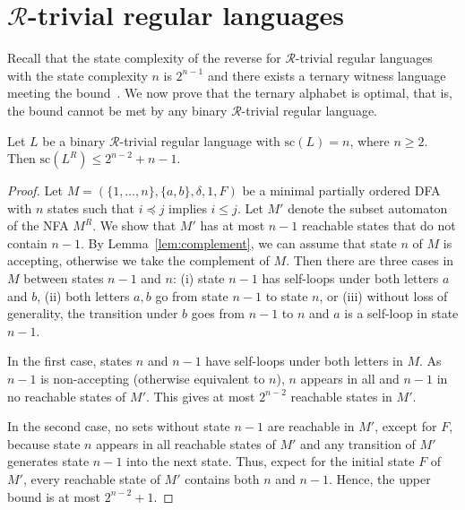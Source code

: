 \documentclass[runningheads]{llncs}
\newcommand{\R}{$\mathcal{R}$}
\renewcommand{\sc}{\mathrm{sc}}
\begin{document}
\section{\R-trivial regular languages}
  Recall that the state complexity of the reverse for \R-trivial regular languages with the state complexity $n$ is $2^{n-1}$ and there exists a ternary witness language meeting the bound~\cite{ciaa2012}. 
  We now prove that the ternary alphabet is optimal,
  that is, the bound
  cannot be met by any binary \R-trivial regular language. 

  \begin{lemma}\label{lem:binaryRtriv_upper}
    Let $L$ be a binary \R-trivial regular language with $\sc(L)=n$, where $n\ge2$.
    Then $\sc(L^R)\le 2^{n-2}+n-1$. 
  \end{lemma}
  \begin{proof}
    Let $M=(\{1,\ldots,n\},\{a,b\},\delta,1,F)$ be a minimal partially ordered DFA
    with $n$ states such that $i\preceq j$ implies $i\le j$. 
    Let $M'$ denote the subset automaton of the NFA $M^R$.
    We show that $M'$ has at most $n-1$ reachable states that do not contain $n-1$. 
    By Lemma~\ref{lem:complement}, we can assume that state $n$ of $M$ is accepting,    
    otherwise we take the complement of $M$. 
    Then there are three cases in $M$ between states $n-1$ and $n$:
    (i)   state $n-1$ has self-loops under both letters $a$ and $b$,
    (ii)  both letters $a,b$ go from state $n-1$ to state $n$, or
    (iii) without loss of generality, the transition under $b$ goes from $n-1$ to $n$ and $a$ is a self-loop in state $n-1$.

    In the first case, 
states $n$ and $n-1$ have self-loops under both letters in $M$.
    As $n-1$ is non-accepting (otherwise equivalent to $n$), $n$ appears in all and $n-1$ in no reachable states of $M'$.
    This gives at most $2^{n-2}$ reachable states in $M'$.
    
    In the second case,
    no sets without state $n-1$ are reachable in $M'$, except for $F$, 
    because state $n$ appears in all reachable states of $M'$ and 
    any transition of $M'$ generates state $n-1$ into the next state.
    Thus, expect for the initial state $F$ of $M'$, every reachable state of $M'$ contains both $n$ and $n-1$.
    Hence, the upper bound is at most $2^{n-2}+1$.


\end{proof}
\end{document}

